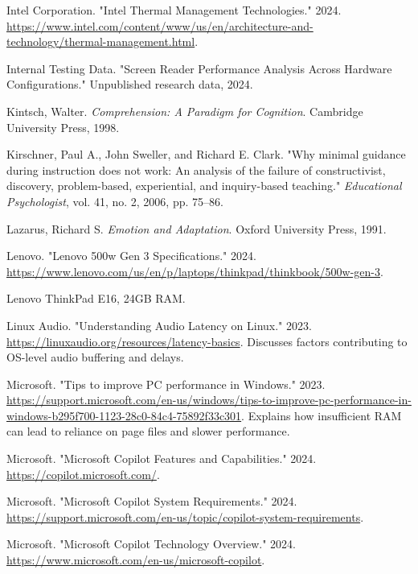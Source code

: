 \begin{thebibliography}{99}
Intel Corporation. "Intel Thermal Management Technologies." 2024. \url{https://www.intel.com/content/www/us/en/architecture-and-technology/thermal-management.html}.

Internal Testing Data. "Screen Reader Performance Analysis Across Hardware Configurations." Unpublished research data, 2024.

Kintsch, Walter. \emph{Comprehension: A Paradigm for Cognition}. Cambridge University Press, 1998.

Kirschner, Paul A., John Sweller, and Richard E. Clark. "Why minimal guidance during instruction does not work: An analysis of the failure of constructivist, discovery, problem-based, experiential, and inquiry-based teaching." \emph{Educational Psychologist}, vol. 41, no. 2, 2006, pp. 75--86.

Lazarus, Richard S. \emph{Emotion and Adaptation}. Oxford University Press, 1991.

Lenovo. "Lenovo 500w Gen 3 Specifications." 2024. \url{https://www.lenovo.com/us/en/p/laptops/thinkpad/thinkbook/500w-gen-3}.

Lenovo ThinkPad E16, 24GB RAM.

Linux Audio. "Understanding Audio Latency on Linux." 2023. \url{https://linuxaudio.org/resources/latency-basics}. Discusses factors contributing to OS-level audio buffering and delays.

Microsoft. "Tips to improve PC performance in Windows." 2023. \url{https://support.microsoft.com/en-us/windows/tips-to-improve-pc-performance-in-windows-b295f700-1123-28c0-84c4-75892f33c301}. Explains how insufficient RAM can lead to reliance on page files and slower performance.

Microsoft. "Microsoft Copilot Features and Capabilities." 2024. \url{https://copilot.microsoft.com/}.

Microsoft. "Microsoft Copilot System Requirements." 2024. \url{https://support.microsoft.com/en-us/topic/copilot-system-requirements}.

Microsoft. "Microsoft Copilot Technology Overview." 2024. \url{https://www.microsoft.com/en-us/microsoft-copilot}.


\end{thebibliography}
